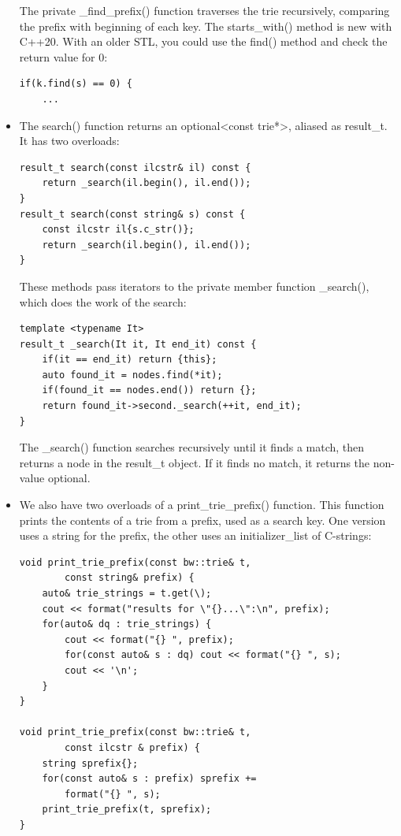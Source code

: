 \begin{itemize}
The private \_find\_prefix() function traverses the trie recursively, comparing the prefix with beginning of each key. The starts\_with() method is new with C++20. With an older STL, you could use the find() method and check the return value for 0:

\begin{lstlisting}[style=styleCXX]
if(k.find(s) == 0) {
	...
\end{lstlisting}

\item 
The search() function returns an optional<const trie*>, aliased as result\_t. It has two overloads:

\begin{lstlisting}[style=styleCXX]
result_t search(const ilcstr& il) const {
	return _search(il.begin(), il.end());
}
result_t search(const string& s) const {
	const ilcstr il{s.c_str()};
	return _search(il.begin(), il.end());
}
\end{lstlisting}

These methods pass iterators to the private member function \_search(), which does the work of the search:

\begin{lstlisting}[style=styleCXX]
template <typename It>
result_t _search(It it, It end_it) const {
	if(it == end_it) return {this};
	auto found_it = nodes.find(*it);
	if(found_it == nodes.end()) return {};
	return found_it->second._search(++it, end_it);
}
\end{lstlisting}

The \_search() function searches recursively until it finds a match, then returns a node in the result\_t object. If it finds no match, it returns the non-value optional.

\item 
We also have two overloads of a print\_trie\_prefix() function. This function prints the contents of a trie from a prefix, used as a search key. One version uses a string for the prefix, the other uses an initializer\_list of C-strings:

\begin{lstlisting}[style=styleCXX]
void print_trie_prefix(const bw::trie& t,
		const string& prefix) {
	auto& trie_strings = t.get(\);
	cout << format("results for \"{}...\":\n", prefix);
	for(auto& dq : trie_strings) {
		cout << format("{} ", prefix);
		for(const auto& s : dq) cout << format("{} ", s);
		cout << '\n';
	}
}

void print_trie_prefix(const bw::trie& t,
		const ilcstr & prefix) {
	string sprefix{};
	for(const auto& s : prefix) sprefix +=
		format("{} ", s);
	print_trie_prefix(t, sprefix);
}
\end{lstlisting}


\end{itemize}
